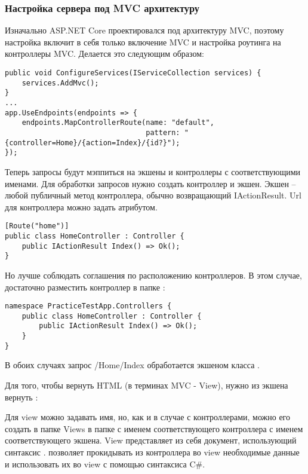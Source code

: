 \documentclass[a4paper,14pt]{extarticle}
\begin{document}
\subsubsection{Настройка сервера под MVC архитектуру}

Изначально ASP.NET Core проектировался под архитектуру MVC, поэтому настройка
включит в себя только включение MVC и настройка роутинга на контроллеры
MVC. Делается это следующим образом:

\begin{lstlisting}
public void ConfigureServices(IServiceCollection services) {
    services.AddMvc();
}
...
app.UseEndpoints(endpoints => {
    endpoints.MapControllerRoute(name: "default",
                                 pattern: "{controller=Home}/{action=Index}/{id?}");
});
\end{lstlisting}

Теперь запросы будут мэппиться на экшены и контроллеры с соответствующими
именами. Для обработки запросов нужно создать контроллер и экшен. Экшен -- любой
публичный метод контроллера, обычно возвращающий IActionResult. Url для
контроллера можно задать атрибутом.

\begin{lstlisting}
[Route("home")] 
public class HomeController : Controller {
    public IActionResult Index() => Ok();
}
\end{lstlisting}

Но лучше соблюдать соглашения по расположению контроллеров. В этом случае,
достаточно разместить контроллер в папке :

\begin{lstlisting}
namespace PracticeTestApp.Controllers { 
    public class HomeController : Controller {
        public IActionResult Index() => Ok();
    }
}
\end{lstlisting}

В обоих случаях запрос /Home/Index обработается экшеном  класса
.

Для того, чтобы вернуть HTML (в терминах MVC - View), нужно из экшена вернуть
:


Для view можно задавать имя, но, как и в случае с контроллерами, можно его
создать в папке Views в папке с именем соответствующего контроллера с именем
соответствующего экшена. View представляет из себя  документ,
использующий синтаксис .  позволяет прокидывать из
контроллера во view необходимые данные и использовать их во view с помощью
синтаксиса C\#.
\end{document}
